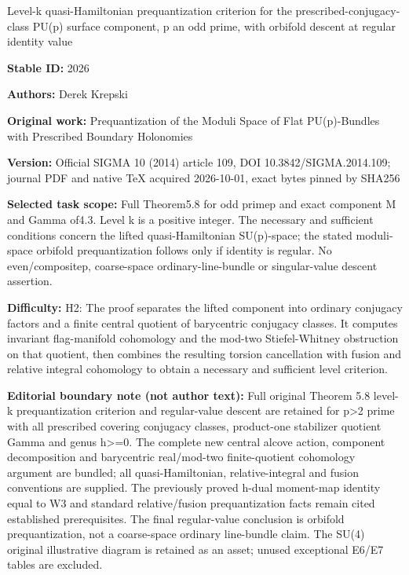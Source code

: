 \documentclass[11pt]{article}
\numberwithin{equation}{section}
\begin{document}
\begin{center}\Large Level-k quasi-Hamiltonian prequantization criterion for the prescribed-conjugacy-class PU(p) surface component, p an odd prime, with orbifold descent at regular identity value\end{center}
\noindent\textbf{Stable ID:} 2026\par
\noindent\textbf{Authors:} Derek Krepski\par
\noindent\textbf{Original work:} Prequantization of the Moduli Space of Flat PU(p)-Bundles with Prescribed Boundary Holonomies\par
\noindent\textbf{Version:} Official SIGMA 10 (2014) article 109, DOI 10.3842/SIGMA.2014.109; journal PDF and native TeX acquired 2026-10-01, exact bytes pinned by SHA256\par
\noindent\textbf{Selected task scope:} Full Theorem5.8 for odd primep and exact component M and Gamma of4.3. Level k is a positive integer. The necessary and sufficient conditions concern the lifted quasi-Hamiltonian SU(p)-space; the stated moduli-space orbifold prequantization follows only if identity is regular. No even/compositep, coarse-space ordinary-line-bundle or singular-value descent assertion.\par
\noindent\textbf{Difficulty:} H2: The proof separates the lifted component into ordinary conjugacy factors and a finite central quotient of barycentric conjugacy classes. It computes invariant flag-manifold cohomology and the mod-two Stiefel-Whitney obstruction on that quotient, then combines the resulting torsion cancellation with fusion and relative integral cohomology to obtain a necessary and sufficient level criterion.\par
\noindent\textbf{Editorial boundary note (not author text):} Full original Theorem 5.8 level-k prequantization criterion and regular-value descent are retained for p>2 prime with all prescribed covering conjugacy classes, product-one stabilizer quotient Gamma and genus h>=\allowbreak{}0. The complete new central alcove action, component decomposition and barycentric real/mod-two finite-quotient cohomology argument are bundled; all quasi-Hamiltonian, relative-integral and fusion conventions are supplied. The previously proved h-dual moment-map identity equal to W3 and standard relative/fusion prequantization facts remain cited established prerequisites. The final regular-value conclusion is orbifold prequantization, not a coarse-space ordinary line-bundle claim. The SU(4) original illustrative diagram is retained as an asset; unused exceptional E6/E7 tables are excluded.\par
\end{document}
